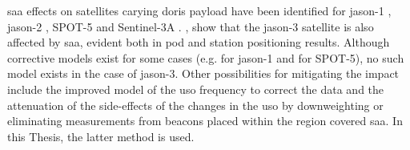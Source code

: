 \gls{saa} effects on satellites carying \gls{doris} payload have been identified 
for \gls{jason}-1 \cite{Willis2003}, \gls{jason}-2 \cite{Willis2016b}, SPOT-5 \cite{Stepanek2013} 
and Sentinel-3A \cite{Jalabert2018}. \cite{Capdeville2016a}, show that the \gls{jason}-3 
satellite is also affected by \gls{saa}, evident both in \gls{pod} and station positioning 
results. Although corrective models exist for some cases (e.g. for \gls{jason}-1 
\cite{Lemoine2006} and \cite{Capdeville2016b} for SPOT-5), no such model exists 
in the case of \gls{jason}-3. Other possibilities for mitigating the impact include the 
improved model of the \gls{uso} frequency to correct the data and the attenuation 
of the side-effects of the changes in the \gls{uso} by downweighting or eliminating 
measurements from beacons placed within the region covered \gls{saa}. In this Thesis, 
the latter method is used.

